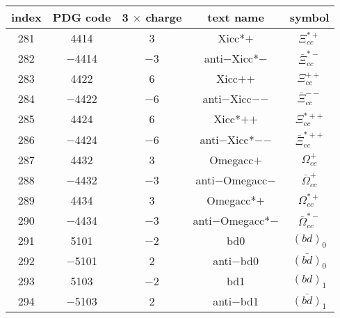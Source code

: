 \documentclass{article}
\begin{document}
\begin{table}[!htbp]
\centering
\begin{tabular}{|c|c|c|c|c|}
\hline
index & PDG code & 3 $\times$ charge & text name & symbol \\
\hline
281 & 4414 & 3 & Xi\underline{\hspace{0.6em}}cc*$+$ & $\Xi_{cc}^{*+}$ \\
\hline
282 & $-$4414 & $-$3 & anti$-$Xi\underline{\hspace{0.6em}}cc*$-$ & $\bar{\Xi}_{cc}^{*-}$ \\
\hline
283 & 4422 & 6 & Xi\underline{\hspace{0.6em}}cc$+$$+$ & $\Xi_{cc}^{++}$ \\
\hline
284 & $-$4422 & $-$6 & anti$-$Xi\underline{\hspace{0.6em}}cc$-$$-$ & $\bar{\Xi}_{cc}^{--}$ \\
\hline
285 & 4424 & 6 & Xi\underline{\hspace{0.6em}}cc*$+$$+$ & $\Xi_{cc}^{*++}$ \\
\hline
286 & $-$4424 & $-$6 & anti$-$Xi\underline{\hspace{0.6em}}cc*$-$$-$ & $\bar{\Xi}_{cc}^{*++}$ \\
\hline
287 & 4432 & 3 & Omega\underline{\hspace{0.6em}}cc$+$ & $\Omega_{cc}^{+}$ \\
\hline
288 & $-$4432 & $-$3 & anti$-$Omega\underline{\hspace{0.6em}}cc$-$ & $\bar{\Omega}_{cc}^{+}$ \\
\hline
289 & 4434 & 3 & Omega\underline{\hspace{0.6em}}cc*$+$ & $\Omega_{cc}^{*+}$ \\
\hline
290 & $-$4434 & $-$3 & anti$-$Omega\underline{\hspace{0.6em}}cc*$-$ & $\bar{\Omega}_{cc}^{*-}$ \\
\hline
291 & 5101 & $-$2 & bd\underline{\hspace{0.6em}}0 & $(bd)_{0}$ \\
\hline
292 & $-$5101 & 2 & anti$-$bd\underline{\hspace{0.6em}}0 & $\bar{(bd)}_{0}$ \\
\hline
293 & 5103 & $-$2 & bd\underline{\hspace{0.6em}}1 & $(bd)_{1}$ \\
\hline
294 & $-$5103 & 2 & anti$-$bd\underline{\hspace{0.6em}}1 & $\bar{(bd)}_{1}$ \\

\end{tabular}
\end{table}
\end{document}
